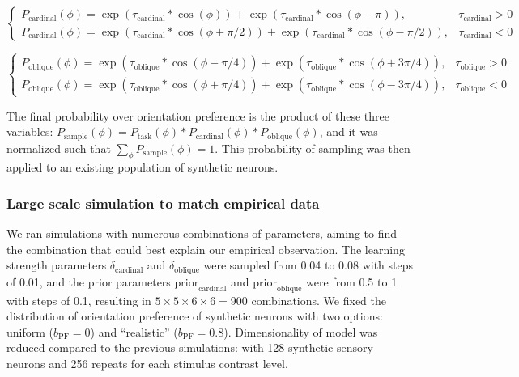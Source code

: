 \documentclass[lineno,pdflatex,sn-basic]{sn-jnl}%
\theoremstyle{thmstyleone}%
\theoremstyle{thmstyletwo}%
\theoremstyle{thmstylethree}%
\begin{document}
\[
\begin{cases}
    P_\textrm{cardinal}(\phi) = \operatorname{exp}(\tau_\textrm{cardinal} *  \operatorname{cos}(\phi)) + \operatorname{exp}(\tau_\textrm{cardinal} *  \operatorname{cos}(\phi - \pi)), & \tau_\textrm{cardinal} > 0 \\
    P_\textrm{cardinal}(\phi) = \operatorname{exp}(\tau_\textrm{cardinal} *  \operatorname{cos}(\phi + \pi/2)) + \operatorname{exp}(\tau_\textrm{cardinal} *  \operatorname{cos}(\phi - \pi/2)), & \tau_\textrm{cardinal} < 0
\end{cases}
\]

\[
\begin{cases}
    P_\textrm{oblique}(\phi) = \operatorname{exp}(\tau_\textrm{oblique} *  \operatorname{cos}(\phi - \pi/4)) + \operatorname{exp}(\tau_\textrm{oblique} *  \operatorname{cos}(\phi + 3\pi/4)), & \tau_\textrm{oblique} > 0 \\
    P_\textrm{oblique}(\phi) = \operatorname{exp}(\tau_\textrm{oblique} *  \operatorname{cos}(\phi + \pi/4)) + \operatorname{exp}(\tau_\textrm{oblique} *  \operatorname{cos}(\phi - 3\pi/4)), & \tau_\textrm{oblique}< 0
\end{cases}
\]

The final probability over orientation preference is the product of these three variables: $P_\textrm{sample}(\phi) = P_\textrm{task}(\phi) * P_\textrm{cardinal}(\phi) *  P_\textrm{oblique}(\phi)$, and it was normalized such that $\sum_{\phi}P_\textrm{sample}(\phi) = 1$. This probability of sampling was then applied to an existing population of synthetic neurons.

\subsubsection{Large scale simulation to match empirical data} \label{sec_ch2:nonideal_simulation_largescale}
We ran simulations with numerous combinations of parameters, aiming to find the combination that could best explain our empirical observation. The learning strength parameters $\delta_\textrm{cardinal}$ and $\delta_\textrm{oblique}$ were sampled from 0.04 to 0.08 with steps of 0.01, and the prior parameters $\textrm{prior}_\textrm{cardinal}$ and $\textrm{prior}_\textrm{oblique}$ were from 0.5 to 1 with steps of 0.1, resulting in $5 \times 5 \times 6 \times 6 = 900$ combinations. We fixed the distribution of orientation preference of synthetic neurons with two options: uniform ($b_\textrm{PF} = 0$) and ``realistic'' ($b_\textrm{PF} = 0.8$). Dimensionality of model was reduced compared to the previous simulations: with 128 synthetic sensory neurons and 256 repeats for each stimulus contrast level.
\end{document}
